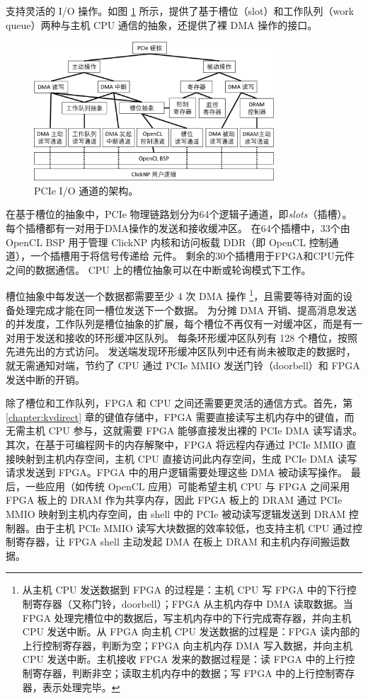 \name 支持灵活的 I/O 操作。如图 \ref{clicknp:fig:pcie-io} 所示，\name 提供了基于槽位（slot）和工作队列（work queue）两种与主机 CPU 通信的抽象，还提供了裸 DMA 操作的接口。


\begin{figure}[htbp]
	\centering
	\includegraphics[width=0.8\textwidth]{image/pcie-io}
	\caption{PCIe I/O 通道的架构。}
	\label{clicknp:fig:pcie-io}
\end{figure}


在基于槽位的抽象中，PCIe 物理链路划分为64个逻辑子通道，即\textit {slots}（插槽）。
每个插槽都有一对用于DMA操作的发送和接收缓冲区。
在64个插槽中，33个由 OpenCL BSP 用于管理 ClickNP 内核和访问板载 DDR（即 OpenCL 控制通道），一个插槽用于将信号传递给 \name 元件。
剩余的30个插槽用于FPGA和CPU元件之间的数据通信。
CPU 上的槽位抽象可以在中断或轮询模式下工作。

槽位抽象中每发送一个数据都需要至少 4 次 DMA 操作 \footnote{从主机 CPU 发送数据到 FPGA 的过程是：主机 CPU 写 FPGA 中的下行控制寄存器（又称门铃，doorbell）；FPGA 从主机内存中 DMA 读取数据。当 FPGA 处理完槽位中的数据后，写主机内存中的下行完成寄存器，并向主机 CPU 发送中断。从 FPGA 向主机 CPU 发送数据的过程是：FPGA 读内部的上行控制寄存器，判断为空；FPGA 向主机内存 DMA 写入数据，并向主机 CPU 发送中断。主机接收 FPGA 发来的数据过程是：读 FPGA 中的上行控制寄存器，判断非空；读取主机内存中的数据；写 FPGA 中的上行控制寄存器，表示处理完毕。}，且需要等待对面的设备处理完成才能在同一槽位发送下一个数据。
为分摊 DMA 开销、提高消息发送的并发度，工作队列是槽位抽象的扩展，每个槽位不再仅有一对缓冲区，而是有一对用于发送和接收的环形缓冲区队列。
每条环形缓冲区队列有 128 个槽位，按照先进先出的方式访问。
发送端发现环形缓冲区队列中还有尚未被取走的数据时，就无需通知对端，节约了 CPU 通过 PCIe MMIO 发送门铃（doorbell）和 FPGA 发送中断的开销。

除了槽位和工作队列，FPGA 和 CPU 之间还需要更灵活的通信方式。首先，第 \ref{chapter:kvdirect} 章的键值存储中，FPGA 需要直接读写主机内存中的键值，而无需主机 CPU 参与，这就需要 FPGA 能够直接发出裸的 PCIe DMA 读写请求。
其次，在基于可编程网卡的内存解聚中，FPGA 将远程内存通过 PCIe MMIO 直接映射到主机内存空间，主机 CPU 直接访问此内存空间，生成 PCIe DMA 读写请求发送到 FPGA。FPGA 中的用户逻辑需要处理这些 DMA 被动读写操作。
最后，一些应用（如传统 OpenCL 应用）可能希望主机 CPU 与 FPGA 之间采用 FPGA 板上的 DRAM 作为共享内存，因此 FPGA 板上的 DRAM 通过 PCIe MMIO 映射到主机内存空间，由 shell 中的 PCIe 被动读写逻辑发送到 DRAM 控制器。由于主机 PCIe MMIO 读写大块数据的效率较低，也支持主机 CPU 通过控制寄存器，让 FPGA shell 主动发起 DMA 在板上 DRAM 和主机内存间搬运数据。



